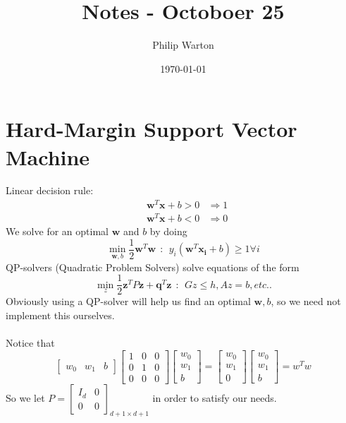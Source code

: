 \documentclass{article}
\theoremstyle{definition}
\begin{document}
\title{Notes - Octoboer 25}
\author{Philip Warton}
\date{\today}
\maketitle
\section{Hard-Margin Support Vector Machine}
Linear decision rule:
    \begin{align*}
        &\bm{w}^T \bm x + b > 0 &\Rightarrow 1 \\
        &\bm{w}^T \bm x + b < 0 &\Rightarrow 0
    \end{align*}
We solve for an optimal $\bm w$ and $b$ by doing
    \[
        \min_{\bm{w},b} \frac{1}{2} \bm w^T \bm w \ \ : \ \ y_i(\bm{w}^T\bm{x_i} + b) \geq 1 \forall i  
    \]
    QP-solvers (Quadratic Problem Solvers) solve equations of the form 
    \[
        \min_z \frac{1}{2} \bm{z}^TP\bm{z} + \bm{q}^T\bm{z} \ \ : \ \ Gz \leq h, Az = b, etc..
    \]
Obviously using a QP-solver will help us find an optimal $\bm w, b$, so we need not implement this ourselves.\\\\
Notice that 
\[
    \begin{bmatrix}
        w_0 & w_1 & b
    \end{bmatrix}\begin{bmatrix}
        1 & 0 & 0 \\
        0 & 1 & 0 \\
        0 & 0 & 0
    \end{bmatrix}\begin{bmatrix}w_0 \\ w_1 \\ b\end{bmatrix} = \begin{bmatrix}
        w_0 \\ w_1 \\ 0
    \end{bmatrix}\begin{bmatrix}w_0 \\ w_1 \\ b\end{bmatrix} = w^Tw
\]
So we let $P = \begin{bmatrix}
    I_d & 0 \\
    0 & 0
\end{bmatrix}_{d + 1 \times d + 1}$ in order to satisfy our needs.
\end{document}
